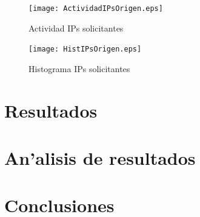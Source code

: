 \documentclass[a4paper,10pt]{article}
\begin{document}
\begin{figure}[!hbp]
\begin{center}
\texttt{[image: ActividadIPsOrigen.eps]}
\end{center}
\caption{Actividad IPs solicitantes} \label{figura4}
\end{figure}

\begin{figure}[!hbp]
\begin{center}
\texttt{[image: HistIPsOrigen.eps]}
\end{center}
\caption{Histograma IPs solicitantes} \label{figura5}
\end{figure}


\clearpage

\section{Resultados}
\label{resultados1:}

\section{An'alisis de resultados}
\label{analisis1:}

\section{Conclusiones}
\label{conclusion1:}

\begin{thebibliography}{99}
\end{thebibliography}
\end{document}

